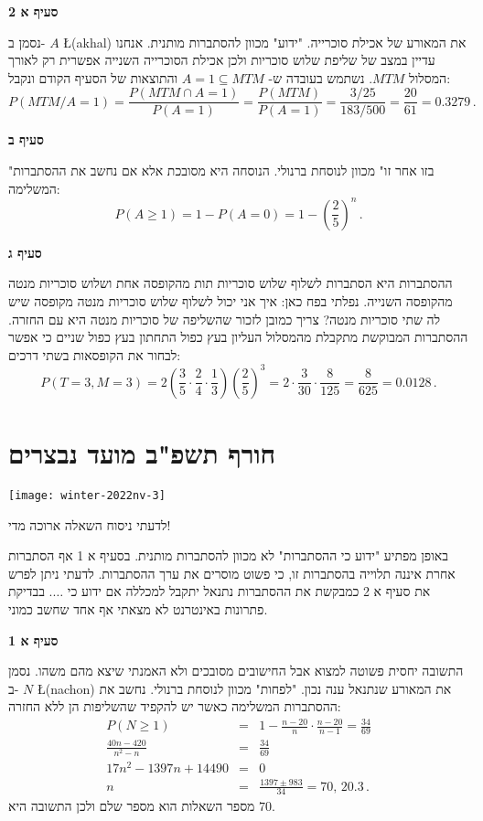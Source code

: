 \textbf{סעיף א 2}

נסמן ב-%
$A$ \L{(akhal)}
את המאורע של אכילת סוכרייה. "ידוע" מכוון להסתברות מותנית. אנחנו עדיין במצב של שליפת שלוש סוכריות ולכן אכילת הסוכרייה השנייה אפשרית רק לאורך המסלול 
$MTM$.
נשתמש בעובדה ש-%
$A=1\subseteq MTM$
והתוצאות של הסעיף הקודם ונקבל:
\[
P(MTM/A=1)=\frac{P(MTM\cap A=1)}{P(A=1)}=\frac{P(MTM)}{P(A=1)}=
\frac{3/25}{183/500}=\frac{20}{61}=0.3279\,.
\]

\textbf{סעיף ב}

"בזו אחר זו" מכוון לנוסחת ברנולי. הנוסחה היא מסובכת אלא אם נחשב את ההסתברות המשלימה:
\[
P(A\geq 1)=1-P(A=0)=1-\left(\frac{2}{5}\right)^n\,.
\]

\textbf{סעיף ג}

ההסתברות היא הסתברות לשלוף שלוש סוכריות תות מהקופסה אחת ושלוש סוכריות מנטה מהקופסה השנייה. נפלתי בפח כאן: איך אני יכול לשלוף שלוש סוכריות מנטה מקופסה שיש לה שתי סוכריות מנטה? צריך כמובן לזכור שהשליפה של סוכריות מנטה היא עם החזרה. ההסתברות המבוקשת מתקבלת מהמסלול העליון בעץ כפול התחתון בעץ כפול שניים כי אפשר לבחור את הקופסאות בשתי דרכים:
\[
P(T=3,M=3)=2\left(\frac{3}{5}\cdot\frac{2}{4}\cdot\frac{1}{3}\right)
\left(\frac{2}{5}\right)^3=2\cdot\frac{3}{30}\cdot\frac{8}{125}=
\frac{8}{625}=0.0128\,.
\]


\newpage

\section{חורף תשפ"ב מועד נבצרים}

\begin{center}
\texttt{[image: winter-2022nv-3]}
\end{center}

לדעתי ניסוח השאלה ארוכה מדי!

באופן מפתיע "ידוע כי ההסתברות" לא מכוון להסתברות מותנית. בסעיף א 1 אף הסתברות אחרת איננה תלוייה בהסתברות זו, כי פשוט מוסרים את ערך ההסתברות. לדעתי ניתן לפרש את סעיף א 2 כמבקשת את ההסתברות נתנאל יתקבל למכללה אם ידוע כי 
$\ldots$.
בבדיקת פתרונות באינטרנט לא מצאתי אף אחד שחשב כמוני.

\textbf{סעיף א 1}

התשובה יחסית פשוטה למצוא אבל החישובים מסובכים ולא האמנתי שיצא מהם משהו. נסמן ב-%
$N$ \L{(nachon)}
את המאורע שנתנאל ענה נכון. "לפחות" מכוון לנוסחת ברנולי. נחשב את ההסתברות המשלימה כאשר יש להקפיד שהשליפות הן ללא החזרה:
\begin{eqnarray*}
P(N\geq 1)&=&1-\frac{n-20}{n}\cdot\frac{n-20}{n-1}=
\frac{34}{69}\\
\frac{40n-420}{n^2-n}&=&\frac{34}{69}\\
17n^2-1397n+14490&=&0\\
n&=&\frac{1397\pm 983}{34}=70,\, 20.3\,.
\end{eqnarray*}
מספר השאלות הוא מספר שלם ולכן התשובה היא
$70$.


